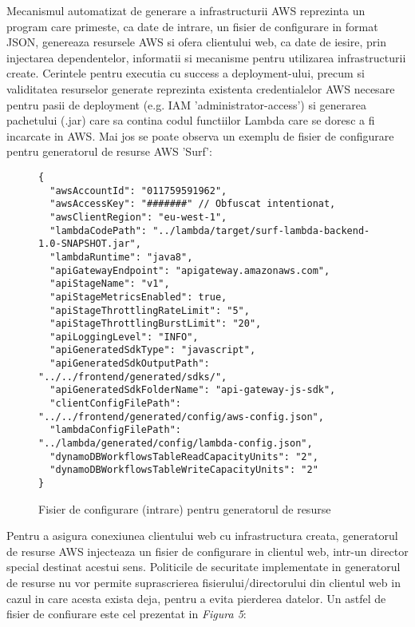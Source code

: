 Mecanismul automatizat de generare a infrastructurii AWS reprezinta un program care primeste, ca date de intrare, un fisier de configurare in format JSON, genereaza resursele AWS si ofera clientului web, ca date de iesire, prin injectarea dependentelor, informatii si mecanisme pentru utilizarea infrastructurii create. Cerintele pentru executia cu success a deployment-ului, precum si validitatea resurselor generate reprezinta existenta credentialelor AWS necesare pentru pasii de deployment (e.g. IAM 'administrator-access') si generarea pachetului (.jar) care sa contina codul functiilor Lambda care se doresc a fi incarcate in AWS. Mai jos se poate observa un exemplu de fisier de configurare pentru generatorul de resurse AWS 'Surf':

\begin{figure}[ht]
\begin{verbatim}
{
  "awsAccountId": "011759591962",
  "awsAccessKey": "#######" // Obfuscat intentionat,
  "awsClientRegion": "eu-west-1",
  "lambdaCodePath": "../lambda/target/surf-lambda-backend-1.0-SNAPSHOT.jar",
  "lambdaRuntime": "java8",
  "apiGatewayEndpoint": "apigateway.amazonaws.com",
  "apiStageName": "v1",
  "apiStageMetricsEnabled": true,
  "apiStageThrottlingRateLimit": "5",
  "apiStageThrottlingBurstLimit": "20",
  "apiLoggingLevel": "INFO",
  "apiGeneratedSdkType": "javascript",
  "apiGeneratedSdkOutputPath": "../../frontend/generated/sdks/",
  "apiGeneratedSdkFolderName": "api-gateway-js-sdk",
  "clientConfigFilePath": "../../frontend/generated/config/aws-config.json",
  "lambdaConfigFilePath": "../lambda/generated/config/lambda-config.json",
  "dynamoDBWorkflowsTableReadCapacityUnits": "2",
  "dynamoDBWorkflowsTableWriteCapacityUnits": "2"
}
\end{verbatim}
\begin{center}
	\caption{Fisier de configurare (intrare) pentru generatorul de resurse}\par\medskip
	\vspace*{-20pt}
\end{center}
\end{figure}

Pentru a asigura conexiunea clientului web cu infrastructura creata, generatorul de resurse AWS injecteaza un fisier de configurare in clientul web, intr-un director special destinat acestui sens. Politicile de securitate implementate in generatorul de resurse nu vor permite suprascrierea fisierului/directorului din clientul web in cazul in care acesta exista deja, pentru a evita pierderea datelor. Un astfel de fisier de confiurare este cel prezentat in \textit{Figura 5}:
\\

